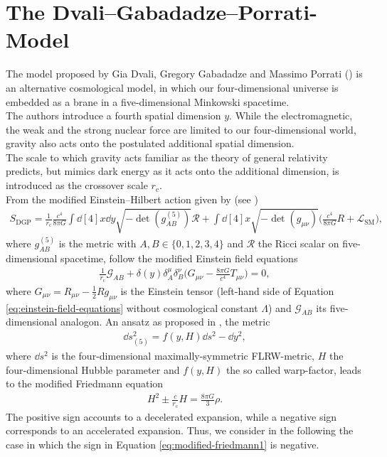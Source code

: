 \chapter{The Dvali--Gabadadze--Porrati-Model}
\label{chap:the-dvali-gabadadze-porrati-model}
\thispagestyle{empty}

The model proposed by Gia Dvali, Gregory Gabadadze and Massimo Porrati (\cite{Dvali2000}) is an alternative cosmological model, in which our four-dimensional universe is embedded as a brane in a five-dimensional Minkowski spacetime. \\
The authors introduce a fourth spatial dimension $y$. While the electromagnetic, the weak and the strong nuclear force are limited to our four-dimensional world, gravity also acts onto the postulated additional spatial dimension. \\
The scale to which gravity acts familiar as the theory of general relativity predicts, but mimics dark energy as it acts onto the additional dimension, is introduced as the crossover scale $r_{\text{c}}$. \\
From the modified Einstein--Hilbert action given by (see \cite{Dvali2003}) 
\begin{align}
    S_{\text{DGP}} = \frac{1}{r_{\text{c}}} \frac{c^4}{8\pi G} \int \dd[4]{x} \dd{y} \sqrt{-\det(g_{AB}^{(5)})} \mathcal{R} + \int \dd[4]{x} \sqrt{-\det(g_{\mu \nu})} \biggl(\frac{c^4}{8 \pi G} R + \mathcal{L}_{\text{SM}} \biggr),
\end{align}
where $g_{AB}^{(5)}$ is the metric with $A, B \in \{0, 1, 2, 3, 4\}$ and $\mathcal{R}$ the Ricci scalar on five-dimensional spacetime, follow the modified Einstein field equations 
\begin{align}
    \frac{1}{r_{\text{c}}} \mathcal{G}_{AB} + \delta(y) \delta_{A}^{\mu} \delta_{B}^{\nu} \biggl( G_{\mu \nu} - \frac{8\pi G}{c^4} T_{\mu \nu} \biggr) = 0, 
\end{align}
where $G_{\mu \nu} = R_{\mu \nu} - \frac{1}{2} R g_{\mu \nu}$ is the Einstein tensor (left-hand side of Equation \eqref{eq:einstein-field-equations} without cosmological constant $\Lambda$) and $\mathcal{G}_{AB}$ its five-dimensional analogon. An ansatz as proposed in \cite{Dvali2003}, the metric 
\begin{align}
    \dd{s}_{(5)}^2 = f(y,H) \dd{s}^2 - \dd{y}^2, 
\end{align}
where $\dd{s}^2$ is the four-dimensional maximally-symmetric FLRW-metric, $H$ the four-dimensional Hubble parameter and $f(y, H)$ the so called warp-factor, leads to the modified Friedmann equation
\begin{align}
    H^{2} \pm \frac{c}{r_{\text{c}}}H = \frac{8 \pi G}{3} \rho.  \label{eq:modified-friedmann1}
\end{align}
The positive sign accounts to a decelerated expansion, while a negative sign corresponds to an accelerated expansion. Thus, we consider in the following the case in which the sign in Equation \eqref{eq:modified-friedmann1} is negative. \\

